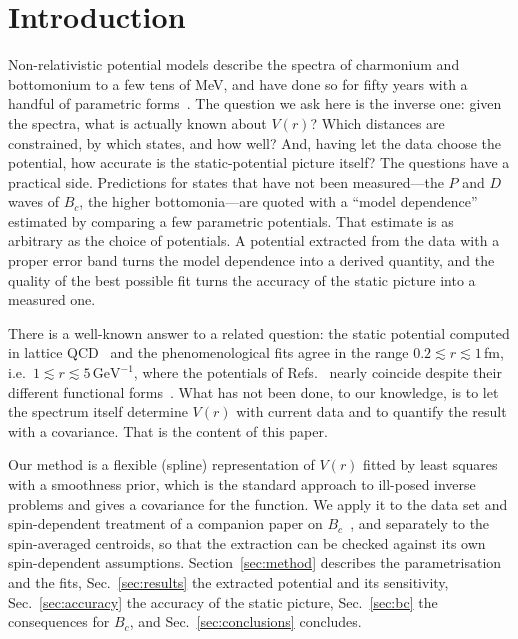 \documentclass[10pt,twocolumn]{article}
\newcommand{\Bc}{B_c}
\newcommand{\GeVi}{\,\mathrm{GeV}^{-1}}
\begin{document}
\section{Introduction}
\label{sec:intro}

Non-relativistic potential models describe the spectra of charmonium and bottomonium to a few tens of MeV, and have done so for fifty years with a handful of parametric forms~\cite{Eichten1978,Quigg1977,Martin1980,Buchmuller1981,Godfrey1985}.
The question we ask here is the inverse one: given the spectra, what is actually known about $V(r)$?
Which distances are constrained, by which states, and how well?
And, having let the data choose the potential, how accurate is the static-potential picture itself?
The questions have a practical side.
Predictions for states that have not been measured---the $P$ and $D$ waves of $\Bc$, the higher bottomonia---are quoted with a ``model dependence'' estimated by comparing a few parametric potentials.
That estimate is as arbitrary as the choice of potentials.
A potential extracted from the data with a proper error band turns the model dependence into a derived quantity, and the quality of the best possible fit turns the accuracy of the static picture into a measured one.

There is a well-known answer to a related question: the static potential computed in lattice QCD~\cite{Bali2001} and the phenomenological fits agree in the range $0.2\lesssim r\lesssim1\,$fm, i.e.\ $1\lesssim r\lesssim5\GeVi$, where the potentials of Refs.~\cite{Eichten1978,Quigg1977,Martin1980} nearly coincide despite their different functional forms~\cite{Kiselev2001}.
What has not been done, to our knowledge, is to let the spectrum itself determine $V(r)$ with current data and to quantify the result with a covariance.
That is the content of this paper.

Our method is a flexible (spline) representation of $V(r)$ fitted by least squares with a smoothness prior, which is the standard approach to ill-posed inverse problems and gives a covariance for the function.
We apply it to the data set and spin-dependent treatment of a companion paper on $\Bc$~\cite{Oppong2026}, and separately to the spin-averaged centroids, so that the extraction can be checked against its own spin-dependent assumptions.
Section~\ref{sec:method} describes the parametrisation and the fits, Sec.~\ref{sec:results} the extracted potential and its sensitivity, Sec.~\ref{sec:accuracy} the accuracy of the static picture, Sec.~\ref{sec:bc} the consequences for $\Bc$, and Sec.~\ref{sec:conclusions} concludes.
\end{document}
